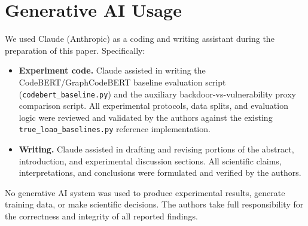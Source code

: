 ﻿\documentclass[sigconf,review,anonymous]{acmart}
\begin{document}
\section{Generative AI Usage}
We used Claude (Anthropic) as a coding and writing assistant during the
preparation of this paper. Specifically:
\begin{itemize}
\item \textbf{Experiment code.} Claude assisted in writing the CodeBERT/GraphCodeBERT
  baseline evaluation script (\texttt{codebert\_baseline.py}) and the
  auxiliary backdoor-vs-vulnerability proxy comparison script. All experimental
  protocols, data splits, and evaluation logic were reviewed and validated by
  the authors against the existing \texttt{true\_loao\_baselines.py} reference
  implementation.
\item \textbf{Writing.} Claude assisted in drafting and revising portions of the
  abstract, introduction, and experimental discussion sections. All scientific
  claims, interpretations, and conclusions were formulated and verified by the
  authors.
\end{itemize}
No generative AI system was used to produce experimental results, generate
training data, or make scientific decisions. The authors take full
responsibility for the correctness and integrity of all reported findings.
\end{document}
